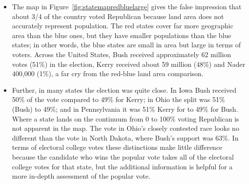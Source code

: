 \begin{itemize}
\item The map in Figure~\ref{fig:statemapredbluelarge} gives the false impression
that about 3/4 of the country voted Republican because
land area does not accurately represent population.
The red states cover far more geographic area than the blue ones, but
they have smaller populations than the blue states; in other words,
the blue states are small in area but large in terms of voters.
Across the United States, Bush received approximately 62 million votes (51\%) 
in the election,
Kerry received about 59 million (48\%) and Nader 400,000 (1\%), a far cry from 
the red-blue land area comparison. 

\item Further, in many states the election was quite close.
In Iowa Bush received 50\% of the vote compared to 49\% for 
Kerry; in Ohio the split was 51\% (Bush) to 49\%; and in Pennsylvania
it was 51\% Kerry for to  49\% for Bush. 
Where a state lands on the continuum from 0 to 100\% voting Republican 
is not apparent in the map.
The vote in Ohio's closely contested race looks no different than
the vote in North Dakota, where Bush's support was 63\%.
In terms of electoral college votes these distinctions make little
difference because the candidate who wins the popular vote takes all of
the electoral college votes for that state, but the additional information 
is helpful for a more in-depth assessment of the popular vote. 
\end{itemize}

